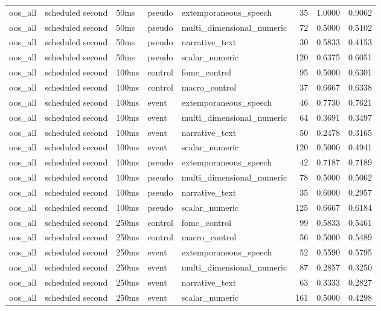 \begin{tabular}{lllllrrr}
oos_all & scheduled second & 50ms & pseudo & extemporaneous_speech & 35 & 1.0000 & 0.9062 \\
oos_all & scheduled second & 50ms & pseudo & multi_dimensional_numeric & 72 & 0.5000 & 0.5102 \\
oos_all & scheduled second & 50ms & pseudo & narrative_text & 30 & 0.5833 & 0.4153 \\
oos_all & scheduled second & 50ms & pseudo & scalar_numeric & 120 & 0.6375 & 0.6051 \\
oos_all & scheduled second & 100ms & control & fomc_control & 95 & 0.5000 & 0.6301 \\
oos_all & scheduled second & 100ms & control & macro_control & 37 & 0.6667 & 0.6338 \\
oos_all & scheduled second & 100ms & event & extemporaneous_speech & 46 & 0.7730 & 0.7621 \\
oos_all & scheduled second & 100ms & event & multi_dimensional_numeric & 64 & 0.3691 & 0.3497 \\
oos_all & scheduled second & 100ms & event & narrative_text & 50 & 0.2478 & 0.3165 \\
oos_all & scheduled second & 100ms & event & scalar_numeric & 120 & 0.5000 & 0.4941 \\
oos_all & scheduled second & 100ms & pseudo & extemporaneous_speech & 42 & 0.7187 & 0.7189 \\
oos_all & scheduled second & 100ms & pseudo & multi_dimensional_numeric & 78 & 0.5000 & 0.5062 \\
oos_all & scheduled second & 100ms & pseudo & narrative_text & 35 & 0.6000 & 0.2957 \\
oos_all & scheduled second & 100ms & pseudo & scalar_numeric & 125 & 0.6667 & 0.6184 \\
oos_all & scheduled second & 250ms & control & fomc_control & 99 & 0.5833 & 0.5461 \\
oos_all & scheduled second & 250ms & control & macro_control & 56 & 0.5000 & 0.5489 \\
oos_all & scheduled second & 250ms & event & extemporaneous_speech & 52 & 0.5590 & 0.5795 \\
oos_all & scheduled second & 250ms & event & multi_dimensional_numeric & 87 & 0.2857 & 0.3250 \\
oos_all & scheduled second & 250ms & event & narrative_text & 63 & 0.3333 & 0.2827 \\
oos_all & scheduled second & 250ms & event & scalar_numeric & 161 & 0.5000 & 0.4298 \\

\end{tabular}
